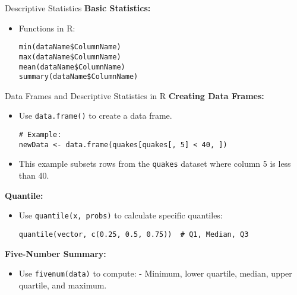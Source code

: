 \documentclass{beamer}
\begin{document}
\begin{frame}[fragile]{Descriptive Statistics}
\textbf{Basic Statistics:}
\begin{itemize}
    \item Functions in R:
    \begin{verbatim}
min(dataName$ColumnName)
max(dataName$ColumnName)
mean(dataName$ColumnName)
summary(dataName$ColumnName)
    \end{verbatim}
\end{itemize}
\end{frame}
\begin{frame}[fragile]{Data Frames and Descriptive Statistics in R}
\textbf{Creating Data Frames:}
\begin{itemize}
    \item Use \texttt{data.frame()} to create a data frame.
    \begin{verbatim}
# Example:
newData <- data.frame(quakes[quakes[, 5] < 40, ])
    \end{verbatim}
    \item This example subsets rows from the \texttt{quakes} dataset where column 5 is less than 40.
\end{itemize}

\textbf{Quantile:}
\begin{itemize}
    \item Use \texttt{quantile(x, probs)} to calculate specific quantiles:
    \begin{verbatim}
quantile(vector, c(0.25, 0.5, 0.75))  # Q1, Median, Q3
    \end{verbatim}
\end{itemize}

\textbf{Five-Number Summary:}
\begin{itemize}
    \item Use \texttt{fivenum(data)} to compute:
        - Minimum, lower quartile, median, upper quartile, and maximum.
\end{itemize}
\end{frame}
\end{document}
